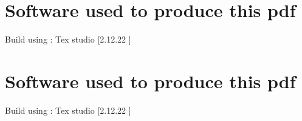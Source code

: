 \chapter{Software used to produce this pdf}
Build using : Tex studio [2.12.22 ]

\chapter{Software used to produce this pdf}
Build using : Tex studio [2.12.22 ]